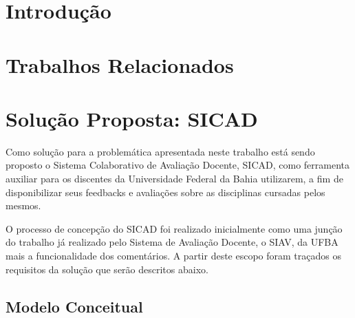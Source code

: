 \documentclass[12pt, a4paper]{report}
\begin{document}
\listoffigures
\cleardoublepage


\listoftables
\cleardoublepage

\chapter{Introdução}

\chapter {Trabalhos Relacionados}

\chapter{Solução Proposta: SICAD}
\par Como solução para a problemática apresentada neste trabalho está sendo proposto o Sistema Colaborativo de Avaliação Docente, SICAD, como ferramenta auxiliar para os discentes da Universidade Federal da Bahia utilizarem, a fim de disponibilizar seus feedbacks e avaliações sobre as disciplinas cursadas pelos mesmos. 
\par O processo de concepção do SICAD foi realizado inicialmente como uma junção do trabalho já realizado pelo Sistema de Avaliação Docente, o SIAV, da UFBA  mais a funcionalidade dos comentários. A partir deste escopo foram traçados os requisitos da solução que serão descritos abaixo.

\section{ Modelo Conceitual}
\end{document}
